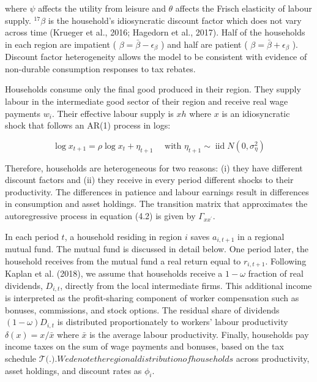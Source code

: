 \documentclass[10pt]{article}
\begin{document}
where $\psi$ affects the utility from leisure and $\theta$ affects the Frisch elasticity of labour supply. ${ }^{17} \beta$ is the household's idiosyncratic discount factor which does not vary across time (Krueger et al., 2016; Hagedorn et al., 2017). Half of the households in each region are impatient ( $\beta= \bar{\beta}-\epsilon_{\beta}$ ) and half are patient ( $\beta=\bar{\beta}+\epsilon_{\beta}$ ). Discount factor heterogeneity allows the model to be consistent with evidence of non-durable consumption responses to tax rebates.

Households consume only the final good produced in their region. They supply labour in the intermediate good sector of their region and receive real wage payments $w_{i}$. Their effective labour supply is $x h$ where $x$ is an idiosyncratic shock that follows an AR(1) process in logs:


\begin{equation*}
\log x_{t+1}=\rho \log x_{t}+\eta_{t+1} \quad \text { with } \eta_{t+1} \sim \operatorname{iid} N\left(0, \sigma_{\eta}^{2}\right) \tag{4.2}
\end{equation*}


Therefore, households are heterogeneous for two reasons: (i) they have different discount factors and (ii) they receive in every period different shocks to their productivity. The differences in patience and labour earnings result in differences in consumption and asset holdings. The transition matrix that approximates the autoregressive process in equation (4.2) is given by $\Gamma_{x x^{\prime}}$.

In each period $t$, a household residing in region $i$ saves $a_{i, t+1}$ in a regional mutual fund. The mutual fund is discussed in detail below. One period later, the household receives from the mutual fund a real return equal to $r_{i, t+1}$. Following Kaplan et al. (2018), we assume that households receive a $1-\omega$ fraction of real dividends, $D_{i, t}$, directly from the local intermediate firms. This additional income is interpreted as the profit-sharing component of worker compensation such as bonuses, commissions, and stock options. The residual share of dividends $(1-\omega) D_{i, t}$ is distributed proportionately to workers' labour productivity $\delta(x)=x / \bar{x}$ where $\bar{x}$ is the average labour productivity. Finally, households pay income taxes on the sum of wage payments and bonuses, based on the tax schedule $\mathcal{T}($.$) . We denote the regional distribution of households$ across productivity, asset holdings, and discount rates as $\phi_{i}$.
\end{document}
